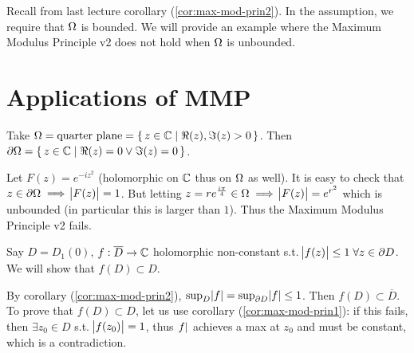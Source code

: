 \setcounter{section}{0}
\setcounter{theorem}{0}


Recall from last lecture corollary (\ref{cor:max-mod-prin2}). In the assumption, we require that $\Omega$ is bounded. We will provide an example where the Maximum Modulus Principle v2 does not hold when $\Omega$ is unbounded.

\section{Applications of MMP}

\begin{counterexample}

Take $\Omega = \text{quarter plane} = \set{ z \in \mathbb{C}\mid \Re (z),\Im(z)  > 0 }$. Then $\partial \Omega = \set{z \in \mathbb{C}\mid \Re(z) = 0 \lor \Im(z) = 0}$.

\begin{center}
\end{center}

Let $F(z) = e^{-iz^2}$ (holomorphic on $\mathbb{C}$ thus on $\Omega$ as well). It is easy to check that $z \in \partial \Omega \implies \abs{F(z)} = 1$. But letting $z = re^{\frac{i \pi}{4}} \in \Omega \implies \abs{F(z)} = e^{r^2}$ which is unbounded (in particular this is larger than $1$). Thus the Maximum Modulus Principle v2 fails.

\end{counterexample}

\begin{example}\label{ex:automorphism-mmp}
Say $D= D_1(0)$, $f: \overline{D} \to \mathbb{C}$ holomorphic non-constant s.t. $\abs{f(z)} \leq 1 \; \forall z \in \partial D$. We will show that $f(D) \subset D$.

By corollary (\ref{cor:max-mod-prin2}), $\sup_{D} \abs{f} = \sup_{\partial D} \abs{f} \leq 1$. Then $f(D) \subset \overline{D}$. To prove that $f(D) \subset D$, let us use corollary (\ref{cor:max-mod-prin1}): if this fails, then $\exists z_0 \in D$ s.t. $\abs{f(z_0)} = 1$, thus $\abs{f}$ achieves a max at $z_0$ and must be constant, which is a contradiction.
\end{example}

